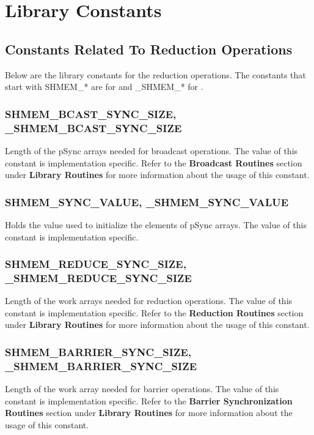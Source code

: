 
\section{Library Constants}


\subsection{Constants Related To Reduction Operations}
Below are the library constants for the reduction operations.
The constants that start with SHMEM\_* are for \Fortran{} and 
\_SHMEM\_* for \Clang.

\subsubsection{SHMEM\_BCAST\_SYNC\_SIZE, \_SHMEM\_BCAST\_SYNC\_SIZE}

Length of the pSync arrays needed for broadcast operations. The value
of this constant is implementation specific. Refer to the \textbf{Broadcast
Routines} section under \textbf{Library Routines} for more information
about the usage of this constant.


\subsubsection{SHMEM\_SYNC\_VALUE, \_SHMEM\_SYNC\_VALUE}

Holds the value used to initialize the elements of pSync arrays. The
value of this constant is implementation specific.


\subsubsection{SHMEM\_REDUCE\_SYNC\_SIZE, \_SHMEM\_REDUCE\_SYNC\_SIZE}

Length of the work arrays needed for reduction operations. The value
of this constant is implementation specific. Refer to the \textbf{Reduction
Routines} section under \textbf{Library Routines} for more information
about the usage of this constant.


\subsubsection{SHMEM\_BARRIER\_SYNC\_SIZE, \_SHMEM\_BARRIER\_SYNC\_SIZE }

Length of the work array needed for barrier operations. The value
of this constant is implementation specific. Refer to the \textbf{Barrier
Synchronization Routines} section under \textbf{Library Routines}
for more information about the usage of this constant.


